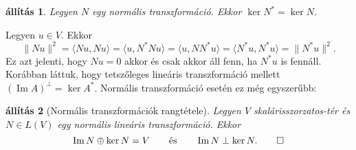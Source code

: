 \documentclass[9pt, a4paper, showtrims]{memoir}
\makeatletter
\renewenvironment{proof}[1][\proofname]
    {\par\pushQED{\qed}%
    \normalfont \topsep6\p@\@plus6\p@\relax
    \trivlist
    \item[\hskip\labelsep
        \itshape
    #1\@addpunct{:}]\ignorespaces}
    {\popQED\endtrivlist\@endpefalse}
\theoremstyle{plain}
\newtheorem{proposition}{állítás}[chapter]
\theoremstyle{remark}
\theoremstyle{definition}
\DeclareMathOperator{\im}{Im}
\newcommand{\ip}[2]{\langle#1,#2\rangle}
\makeatother
\begin{document}
\begin{proposition}
	Legyen $N$ egy normális transzformáció.
	Ekkor $\ker N^\ast=\ker N$.
\end{proposition}
\begin{proof}
	Legyen $u\in V.$
	Ekkor
	\[
		\|Nu\|^2
		=
		\ip{Nu}{Nu}
		=
		\ip{u}{N^\ast Nu}
		=
		\ip{u}{NN^\ast u}
		=
		\ip{N^\ast u}{N^\ast u}
		=
		\|N^\ast u\|^2.
	\]
	Ez azt jelenti, hogy $Nu=0$ akkor és csak akkor áll fenn,
	ha $N^\ast u$ is fennáll.
\end{proof}
Korábban láttuk,
hogy tetszőleges lineáris transzformáció mellett $(\im A)^\perp=\ker A^\ast.$
Normális transzformáció esetén ez még egyszerűbb:
\begin{proposition}[Normális transzformációk rangtétele]\label{pr:normalisrang}
	Legyen $V$ skalárisszorzatos-tér és $N\in L\left( V \right)$ egy normális lineáris transzformáció.
	Ekkor
	\[
		\im N\oplus\ker N=V\qquad\text{és}\qquad \im N\perp \ker N.
		\qedhere
	\]
\end{proposition}
\end{document}
